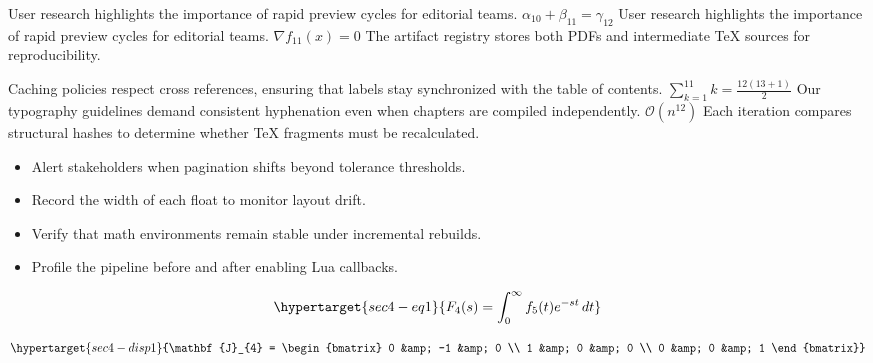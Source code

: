 \documentclass[12pt,a4paper,twocolumn]{article}
\newcommand{\paraid}[1]{\par\noindent\hypertarget{#1}{\ignorespaces}}
\begin{document}
\paraid{sec4-p6}User research highlights the importance of rapid preview cycles for editorial teams. $\alpha_{10} + \beta_{11} = \gamma_{12}$ User research highlights the importance of rapid preview cycles for editorial teams. $\nabla f_{11}(x) = 0$ The artifact registry stores both PDFs and intermediate TeX sources for reproducibility.
\par

\paraid{sec4-p7}Caching policies respect cross references, ensuring that labels stay synchronized with the table of contents. $\sum_{k=1}^{11} k = \frac{12(13+1)}{2}$ Our typography guidelines demand consistent hyphenation even when chapters are compiled independently. $\mathcal{O}(n^{12})$ Each iteration compares structural hashes to determine whether TeX fragments must be recalculated.
\par

\begin{itemize}

\item 
        Alert stakeholders when pagination shifts beyond tolerance thresholds.
      

\item 
        Record the width of each float to monitor layout drift.
      

\item 
        Verify that math environments remain stable under incremental rebuilds.
      

\item 
        Profile the pipeline before and after enabling Lua callbacks.
      

\end{itemize}

\begin{equation}
\hypertarget{sec4-eq1}{F_{4}(s) = \int_{0}^{\infty} f_{5}(t) e^{-st} \, dt}
\label{eq:sec4-eq1}
\end{equation}

\[
\hypertarget{sec4-disp1}{\mathbf{J}_{4} = \begin{bmatrix} 0 &amp; -1 &amp; 0 \\ 1 &amp; 0 &amp; 0 \\ 0 &amp; 0 &amp; 1 \end{bmatrix}}
\]
\end{document}
